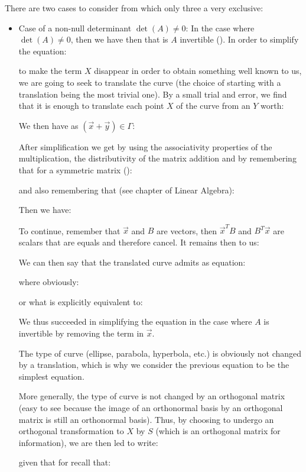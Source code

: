 	There are two cases to consider from which only three a very exclusive:
	\begin{itemize}
		\item Case of a non-null determinant $\det(A)\neq 0$:
		In the case where $\det(A)\neq 0$, then we have then that is $A$ invertible (). In order to simplify the equation:
		
	 	to make the term $X$ disappear in order to obtain something well known to us, we are going to seek to translate the curve (the choice of starting with a translation being the most trivial one). By a small trial and error, we find that it is enough to translate each point $X$ of the curve from an $Y$ worth:
		
		We then have as $(\vec{x}+\vec{y})\in \Gamma$:
		
	 	After simplification we get by using the associativity properties of the multiplication, the distributivity of the matrix addition and by remembering that for a symmetric matrix ():
		
		and also remembering that (see chapter of Linear Algebra):
		
		Then we have:
		
		To continue, remember that $\vec{x}$ and $B$ are vectors, then $\vec{x}^TB$ and $B^T\vec{x}$ are scalars that are equals and therefore cancel. It remains then to us:
		
		We can then say that the translated curve admits as equation:
	
	where obviously:
	
 	or what is explicitly equivalent to:
	
	We thus succeeded in simplifying the equation in the case where $A$ is invertible by removing the term in $\vec{x}$.

	The type of curve (ellipse, parabola, hyperbola, etc.) is obviously not changed by a translation, which is why we consider the previous equation to be the simplest equation.

	More generally, the type of curve is not changed by an orthogonal matrix (easy to see because the image of an orthonormal basis by an orthogonal matrix is still an orthonormal basis). Thus, by choosing to undergo an orthogonal transformation to $X$ by $S$ (which is an orthogonal matrix for information), we are then led to write:
	
	given that for recall that:
	

\end{itemize}
